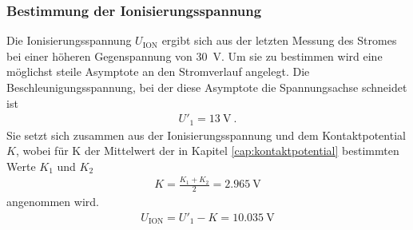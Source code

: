 \subsubsection{Bestimmung der Ionisierungsspannung}\label{sec:auswertung4}
Die Ionisierungsspannung $U_\text{ION}$ ergibt sich aus der letzten Messung des Stromes bei einer höheren Gegenspannung von \SI{30}{\volt}. Um sie zu bestimmen wird eine möglichst steile Asymptote an den Stromverlauf angelegt. Die Beschleunigungsspannung, bei der diese Asymptote die Spannungsachse schneidet ist
\begin{align}
	U'_1 = \SI{13}{\volt} \ .
\end{align}
Sie setzt sich zusammen aus der Ionisierungsspannung und dem Kontaktpotential $K$, wobei für K der Mittelwert der in Kapitel \ref{cap:kontaktpotential} bestimmten Werte $K_1$ und $K_2$
\begin{align}
	K = \frac{K_1+K_2}{2} = \SI{2.965}{\volt}
\end{align}
angenommen wird. 
\begin{align}
	U_\text{ION} = U'_1 - K = \SI{10.035}{\volt}
\end{align}